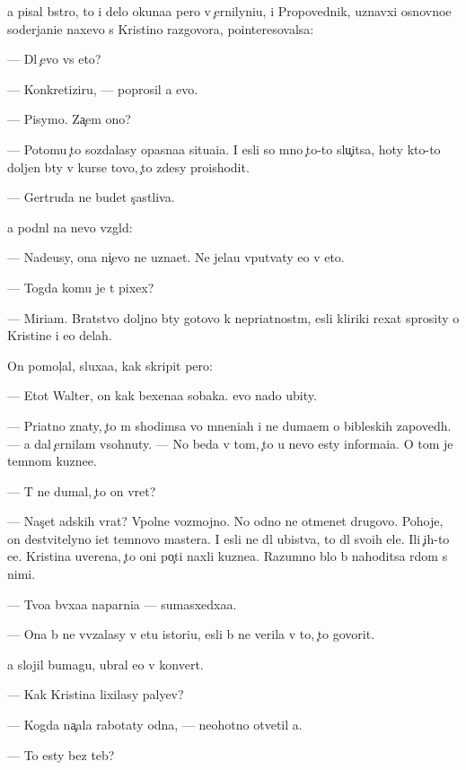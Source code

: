 \documentclass[10pt]{book}
\begin{document}
{\Y}a pisal b{\yi}stro, to i delo okuna{\y}a pero v {\c}ernilyni{\q}u, i Propovednik, uznavxi{\y} osnovno{\y}e soderjani{\y}e naxevo s Kristino{\y} razgovora, pointeresovalsa:

— Dl{\ia} {\c}evo vs{\e} eto?

— Konkretiziru{\y}, — poprosil {\y}a {\y}evo.

— Pisymo. Za{\c}em ono?

— Potomu {\c}to sozdalasy opasna{\y}a situa{\q}i{\y}a. I {\y}esli so mno{\y} {\c}to-to slu{\c}itsa, hoty kto-to doljen b{\yi}ty v kurse tovo, {\c}to zdesy proishodit.

— Gertruda ne budet s{\c}astliva.

{\Y}a podn{\ia}l na nevo vzgl{\ia}d:

— Nade{\y}usy, ona ni{\c}evo ne uzna{\y}et. Ne jela{\y}u vput{\yi}vaty {\y}e{\y}o v eto.

— Togda komu je t{\yi} pixex?

— Miriam. Bratstvo doljno b{\yi}ty gotovo k nepri{\y}atnost{\ia}m, {\y}esli kliriki rexat sprosity o Kristine i {\y}e{\y}o delah.

On pomol{\c}al, sluxa{\y}a, kak skripit pero:

— Etot Walter, on kak bexena{\y}a sobaka. {\Y}evo nado ubity.

— Pri{\y}atno znaty, {\c}to m{\yi} shodimsa vo mneni{\y}ah i ne duma{\y}em o bible{\y}skih zapoved{\ia}h. — {\Y}a dal {\c}ernilam v{\yi}sohnuty. — No beda v tom, {\c}to u nevo {\y}esty informa{\q}i{\y}a. O tom je temnom kuzne{\q}e.

— T{\yi} ne dumal, {\c}to on vret?

— Nas{\c}et adskih vrat? Vpolne vozmojno. No odno ne otmen{\ia}{\y}et drugovo. Pohoje, on de{\y}stvitelyno i{\x}et temnovo mastera. I {\y}esli ne dl{\ia} ubi{\y}stva, to dl{\ia} svo{\y}ih {\q}ele{\y}. Ili {\c}{\yf}ih-to {\y}e{\x}e. Kristina uverena, {\c}to oni po{\c}ti naxli kuzne{\q}a. Razumno b{\yi}lo b{\yi} nahoditsa r{\ia}dom s nimi.

— Tvo{\y}a b{\yi}vxa{\y}a naparni{\q}a — sumasxedxa{\y}a.

— Ona b{\yi} ne vv{\ia}zalasy v etu istori{\y}u, {\y}esli b{\yi} ne verila v to, {\c}to govorit.

{\Y}a slojil bumagu, ubral {\y}e{\y}o v konvert.

— Kak Kristina lixilasy paly{\q}ev?

— Kogda na{\c}ala rabotaty odna, — neohotno otvetil {\y}a.

— To {\y}esty bez teb{\ia}?
\end{document}
